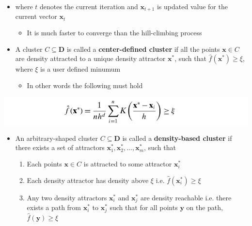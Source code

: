 \documentclass[11pt]{article}
\begin{document}
\begin{itemize}
\item where \(t\) denotes the current iteration and \(\pmb x_{t+1}\) is updated value for the current vector \(\pmb x_t\)
\begin{itemize}
\item It is much faster to converge than the hill-climbing process
\end{itemize}

\item A cluster \(C \subseteq \mathbf D\) is called a \textbf{center-defined cluster} if all the points \(\pmb x \in C\) are density attracted to a unique density attractor \(\pmb x^*\), such that \(\hat f (\pmb x^*) \geq \xi\), where \(\xi\) is a user defined minumum
\begin{itemize}
\item In other words the following must hold
\end{itemize}
\end{itemize}
\begin{center}
\includegraphics[width=.9\linewidth]{Density-based Clustering/screenshot_2018-12-02_12-30-55.png}
\end{center}

\begin{itemize}
\item An arbitrary-shaped cluster \(C \subseteq \mathbf D\) is called a \textbf{density-based cluster} if there exists a set of attractors \(\pmb x_1^*, \pmb x_2^*, \dots, \pmb x_m^*\), such that 
\begin{enumerate}
\item Each points \(\pmb x \in C\) is attracted to some attractor \(\pmb x_i^*\)
\item Each density attractor has density above \(\xi\) i.e. \(\hat f (\pmb x_i^*) \geq \xi\)
\item Any two density attractors \(\pmb x_i^*\) and \(\pmb x_j^*\) are density reachable i.e. there exists a path from \(\pmb x_i^*\) to \(\pmb x_j^*\) such that for all points \(\pmb y\) on the path, \(\hat f(\pmb y) \geq \xi\)
\end{enumerate}
\end{itemize}
\end{document}
